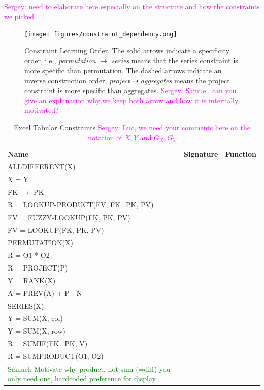 \documentclass{ecai}
\newcommand{\sergey}[1]{\textcolor{magenta}{{\sc Sergey:} #1}\xspace}
\newcommand{\samuel}[1]{\textcolor{green}{{\sc Samuel:} #1}\xspace}
\newcommand{\format}[1]{\textit{#1}\xspace}
\newcommand{\CName}{Name\xspace}
\newcommand{\CSignature}{Signature\xspace}
\newcommand{\CFunction}{Function\xspace}
\begin{document}
\sergey{need to elaborate here especially on the structure and how the constraints we picked}

\begin{figure}[htb]
  \centering
  \texttt{[image: figures/constraint\_dependency.png]}
  \caption{Constraint Learning Order. The solid arrows indicate a specificity order, i.e., \textit{permutation} $\rightarrow$ \textit{series} means that the series constraint is more specific than permutation. The dashed arrows indicate an inverse construction order, \textit{project} $\dashrightarrow$ \textit{aggregates} means the project constraint is more specific than aggregates. \sergey{Samuel,  can you give an explanation why we keep both arrow and how it is internally motivated?}}
  \label{fig:learning_order}
\end{figure}


\newcommand{\numeric}{\format{numeric}}
\newcommand{\textual}{\format{textual}}
\newcommand{\integer}{\format{integer}}
\newcommand{\length}{\format{length}}
\newcommand{\nat}{\mathcal{N}}

\begin{table}
  \centering
  \begin{tabular}{lcc}
    \textbf{\CName} & \textbf{\CSignature} & \textbf{\CFunction}\\
    ALLDIFFERENT(X) & & \\
    X = Y & & \\
    FK $\rightarrow$ PK & & \\
    R = LOOKUP-PRODUCT(FV, FK=PK, PV) & & \\
    FV = FUZZY-LOOKUP(FK, PK, PV) & & \\
    FV = LOOKUP(FK, PK, PV) & & \\
    PERMUTATION(X) & & \\
    R = O1 * O2 & & \\
    R = PROJECT(P) & & \\
     Y = RANK(X)   & & \\
    A = PREV(A) + P - N & & \\
    SERIES(X) & & \\
    Y = SUM(X, col) & & \\
    Y = SUM(X, row) & & \\
    R = SUMIF(FK=PK, V) & & \\
    R = SUMPRODUCT(O1, O2) & & \\

\samuel{Motivate why product, not sum (=diff) you only need one, hardcoded preference for display}

  \end{tabular}
  \caption{Excel Tabular Constraints \sergey{Luc, we need your comments here on the notation of $X,Y$ and $G_X,G_Y$}}
  \label{table:constraints}
\end{table}
\end{document}
